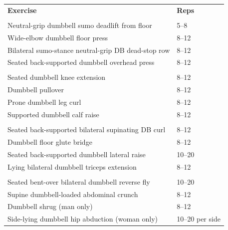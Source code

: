 \documentclass[11pt,a4paper]{article}
\begin{document}
\vspace{0.20cm}
\setlength{\arrayrulewidth}{0.42pt}
\renewcommand{\arraystretch}{1.82}
\setlength{\tabcolsep}{7pt}
{\fontsize{9.15}{10.8}\selectfont
\begin{tabular}{@{}L{14.458cm} C{2.05cm}@{}}
\textbf{Exercise} & \textbf{Reps} \\
 \\
Neutral-grip dumbbell sumo deadlift from floor & 5--8 \\
\hline
Wide-elbow dumbbell floor press & 8--12 \\
\hline
Bilateral sumo-stance neutral-grip DB dead-stop row & 8--12 \\
\hline
Seated back-supported dumbbell overhead press & 8--12 \\
 \\
Seated dumbbell knee extension & 8--12 \\
\hline
Dumbbell pullover & 8--12 \\
\hline
Prone dumbbell leg curl & 8--12 \\
\hline
Supported dumbbell calf raise & 8--12 \\
 \\
Seated back-supported bilateral supinating DB curl & 8--12 \\
\hline
Dumbbell floor glute bridge & 8--12 \\
\hline
Seated back-supported dumbbell lateral raise & 10--20 \\
\hline
Lying bilateral dumbbell triceps extension & 8--12 \\
 \\
Seated bent-over bilateral dumbbell reverse fly & 10--20 \\
\hline
Supine dumbbell-loaded abdominal crunch & 8--12 \\
\hline
Dumbbell shrug (man only) & 8--12 \\
\hline
Side-lying dumbbell hip abduction (woman only) & 10--20 per side \\
\end{tabular}\par
}
\end{document}
